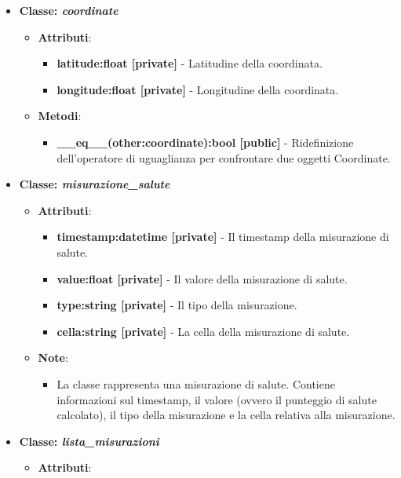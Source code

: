 \begin{itemize}
    \item\textbf{Classe: \textit{coordinate}}
    \begin{itemize}
        \item    \textbf{Attributi}: 
    \begin{itemize}
        \item \textbf{latitude:float [private]} - Latitudine della coordinata.
        \item \textbf{longitude:float [private]} - Longitudine della coordinata.
    \end{itemize}
    \item     \textbf{Metodi}: 
    \begin{itemize}
        \item \textbf{\_\_eq\_\_(other:coordinate):bool [public]} - Ridefinizione dell'operatore di uguaglianza per confrontare due oggetti Coordinate.
    \end{itemize}
\end{itemize}
\item\textbf{Classe: \textit{misurazione\_salute}}
    \begin{itemize}
    \item\textbf{Attributi}:
        \begin{itemize}
        \item \textbf{timestamp:datetime [private]} - Il timestamp della misurazione di salute.
        \item \textbf{value:float [private]} - Il valore della misurazione di salute.
        \item \textbf{type:string [private]} - Il tipo della misurazione.
        \item \textbf{cella:string [private]} - La cella della misurazione di salute.
    \end{itemize}
    \item\textbf{Note}:
        \begin{itemize}
            \item La classe rappresenta una misurazione di salute. Contiene informazioni sul timestamp, il valore (ovvero il punteggio di salute calcolato), il tipo della misurazione e la cella relativa alla misurazione.
        \end{itemize}
    \end{itemize}
    \item\textbf{Classe: \textit{lista\_misurazioni}}
    \begin{itemize}
    \item\textbf{Attributi}:
        \begin{itemize}

\end{itemize}
\end{itemize}
\end{itemize}
